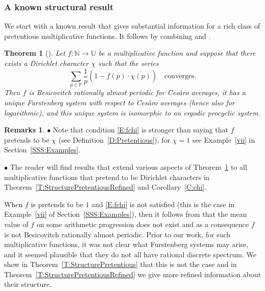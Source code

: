 \documentclass[11pt]{amsart}
\newtheorem{theorem}[lemma]{Theorem}
\theoremstyle{definition}
\newtheorem*{remarks}{Remarks}
\newcommand{\N}{{\mathbb N}}
\renewcommand{\P}{{\mathbb P}}
\newcommand{\U}{{\mathbb U}}
\begin{document}
 	\subsubsection{A known structural result}
We  start with a known result  that gives substantial  information for a rich class of
pretentious multiplicative functions.  	
 It  follows by combining \cite[Theorem~6]{DD82} and \cite[Theorem~1.7]{BPLR19}.
 	\begin{theorem}[\cite{BPLR19,DD82}]\label{T:RAP}
 		Let $f\colon \N\to \U$ be a multiplicative function and suppose
 		that there exists a Dirichlet character $\chi$ such that the series
 		\begin{equation}\label{E:fchi}
 			\sum_{p\in\P}\frac{1}{p}(1-f(p)\cdot \overline{\chi(p)}) \quad \text{converges}.
 		\end{equation}
 		Then $f$ is Besicovitch rationally almost periodic for Ces\`aro averages,
 		 it has a unique Furstenberg system with respect to Ces\`aro averages (hence also for logarithmic), and this unique system is isomorphic to  an ergodic procyclic system.
 	\end{theorem}
 \begin{remarks}
$\bullet$ 	Note that condition  \eqref{E:fchi}  is stronger than saying that $f$ pretends to be $\chi$ (see Definition~\ref{D:Pretentious}),  for $\chi=1$ see Example~\eqref{vii} in Section~\ref{SSS:Examples}.


$\bullet$ The reader will find results that extend various aspects  of Theorem~\ref{T:RAP} to all  multiplicative functions that pretend to be Dirichlet characters in   Theorem~\ref{T:StructurePretentiousRefined} and  Corollary~\ref{C:chi}.
\end{remarks} 	
  	 When $f$ is pretends to be $1$ and \eqref{E:fchi} is not satisfied (this is the case in Example~\eqref{vii} of Section~\ref{SSS:Examples}), then it follows from \cite[Corollary~2]{DD82} that the mean value of $f$ on some arithmetic progression does not exist
 	and as a consequence $f$ is not  Besicovitch rationally almost periodic.  Prior to our work, for such multiplicative functions,  it was not clear what Furstenberg systems may arise, and  it seemed plausible that they do not all have rational discrete spectrum.  We show   in Theorem~\ref{T:StructurePretentious} that this is not the case and in Theorem~\ref{T:StructurePretentiousRefined}  we give more refined information about  their structure.
 	
\end{document}

